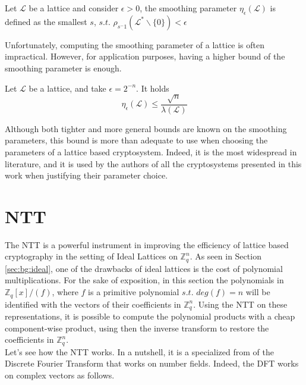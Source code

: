 \begin{definition}
Let $\mathscr{L}$ be a lattice and consider $\epsilon>0$, the smoothing parameter $\eta_\epsilon(\mathscr{L})$ is defined as the smallest $s$, $s.t.$ $\rho_{s^-1}(\mathscr{L}^*\backslash\{0\})<\epsilon$
\end{definition}

Unfortunately, computing the smoothing parameter of a lattice is often impractical. However, for application purposes, having a higher bound of the smoothing parameter is enough.

\begin{theorem}
Let $\mathscr{L}$ be a lattice, and take $\epsilon=2^{-n}$. It holds
\begin{equation*}
\eta_\epsilon(\mathscr{L})\leq\frac{\sqrt{n}}{\lambda\left(\mathscr{L}\right)}
\end{equation*}
\end{theorem}

Although both tighter and more general bounds are known on the smoothing parameters, this bound is more than adequate to use when choosing the parameters of a lattice based cryptosystem. Indeed, it is the most widespread in literature, and it is used by the authors of all the cryptosystems presented in this work when justifying their parameter choice.

\section{NTT}\label{sec:bg:ntt}

The NTT is a powerful instrument in improving the efficiency of lattice based cryptography in the setting of Ideal Lattices on $\mathbb{Z}_q^n$. As seen in Section \ref{sec:bg:ideal}, one of the drawbacks of ideal lattices is the cost of polynomial multiplications. For the sake of exposition, in this section the polynomials in $\mathbb{Z}_q[x]/(f)$, where $f$ is a primitive polynomial $s.t.$ $deg(f)=n$ will be identified with the vectors of their coefficients in $\mathbb{Z}_q^n$. Using the NTT on these representations, it is possible to compute the polynomial products with a cheap component-wise product, using then the inverse transform to restore the coefficients in $\mathbb{Z}_q^n$.\\

Let's see how the NTT works. In a nutshell, it is a specialized from of the Discrete Fourier Transform that works on number fields. Indeed, the DFT works on complex vectors as follows.

